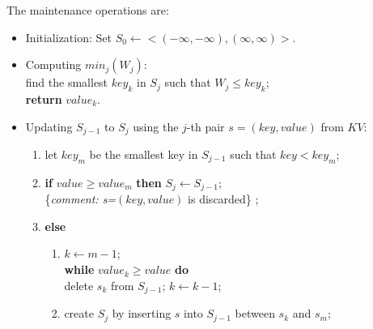 The maintenance operations are:
\begin{itemize}
	\item  Initialization: Set $S_0 \leftarrow <(-\infty,-\infty), (\infty,\infty)>$.
	\item  Computing $min_j(W_j)$:\\
	find the smallest $key_{k}$ in $S_{j}$ such that 
	$W_j\leq key_{k}$;\\  \textbf{return} $value_{k}$.\\
	\item Updating $S_{j-1}$ to $S_j$ using the $j$-th pair $s=(key, value)$ from $KV$:
	\begin{enumerate}
		\item let $key_{m}$ be the smallest key in $S_{j-1}$ such that 
		$key < key_{m}$;
		\item {\bf if} $value\geq value_{m}$ \textbf{then} $S_j \leftarrow S_{j-1}$;\\
		\{\emph{comment:  s=$(key,value)$ } is discarded\} ; \label{i.discard}
		\item \textbf{else} \label{i.else}
		  \begin{enumerate}
		  	\item $k \leftarrow m-1$;\\  \textbf{while} $value_k \geq value $ \textbf{do} \\
		  		delete $s_k$ from $S_{j-1}$; $k\leftarrow k-1$;\label{i.while}
		  	\item  create $S_j$ by inserting $ s$ into $S_{j-1}$ between $s_k$ and $s_m$;
		  	\label{i.insert}
		  \end{enumerate} 
	\end{enumerate}
\end{itemize}
 
